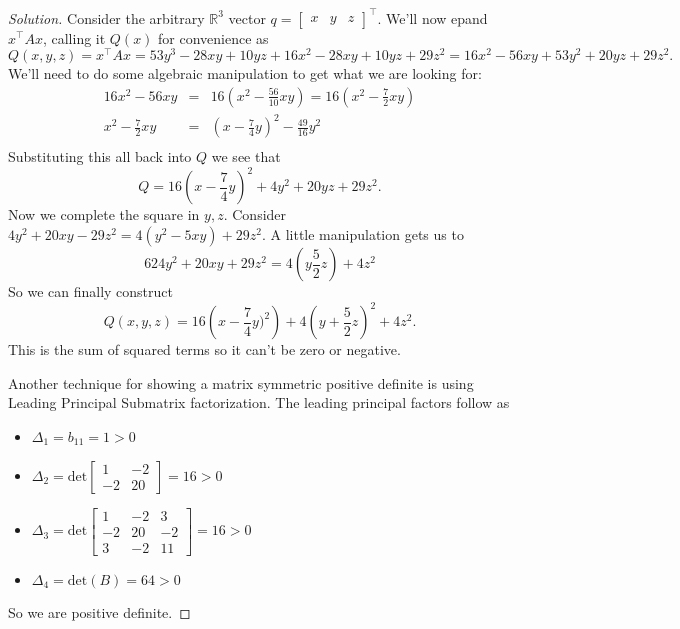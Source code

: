 \documentclass[12pt]{amsart}
\newenvironment{solution}
{\begin{proof}[Solution]}
{\end{proof}}
\begin{document}
\begin{onehalfspace}
\begin{solution}
            Consider the arbitrary $\mathbb{R}^3$ vector $q=[\begin{matrix}x & y & z\end{matrix}]^\top$.
            We'll now epand $x^\top Ax$, calling it $Q(x)$ for convenience as
            \begin{displaymath}
                Q(x,y,z) = x^\top Ax = 53y^3-28xy+10yz+16x^2-28xy+10yz+29z^2 = 16 x^2 - 56 x y + 53 y^2 + 20 y z + 29 z^2.
            \end{displaymath}
            We'll need to do some algebraic manipulation to get what we are looking for:
            \begin{eqnarray*}
                16x^2-56xy & = & 16\left(x^2 - \frac{56}{10}xy\right) = 16(x^2-\frac{7}{2}xy) \\
                x^2 - \frac{7}{2}xy & = & \left(x-\frac{7}{4}y\right)^2 - \frac{49}{16}y^2\\
            \end{eqnarray*}
            Substituting this all back into $Q$ we see that
            \begin{displaymath}
                Q = 16\left(x -\frac{7}{4}y\right)^2 +4y^2+20yz+29z^2.
            \end{displaymath}
            Now we complete the square in $y,z$.
            Consider $4y^2+20xy-29z^2=4(y^2-5xy) + 29z^2$.
            A little manipulation gets us to
            \begin{displaymath}62
                4y^2+20xy+29z^2 = 4\left(y\frac{5}{2}z\right) + 4z^2
            \end{displaymath}
            So we can finally construct
            \begin{displaymath}
                Q(x,y,z) = 16\left(x-\frac{7}{4}y)^2\right) + 4\left(y + \frac{5}{2}z\right)^2 + 4z^2.
            \end{displaymath}
            This is the sum of squared terms so it can't be zero or negative.

            Another technique for showing a matrix symmetric positive definite is using
            Leading Principal Submatrix factorization.
            The leading principal factors follow as
            \begin{itemize}
                \item[-] $\Delta_1 = b_{11} = 1 >0$
                \item[-] $\Delta_2 = \text{det}\left[\begin{matrix}1 & -2\\-2 & 20\end{matrix}\right] = 16 >0$
                \item[-] $\Delta_3 = \text{det}\left[\begin{matrix}1 & -2 & 3\\-2 & 20 & -2\\3 & -2 & 11\end{matrix}\right] = 16 > 0$
                \item[-] $\Delta_4 = \text{det}(B) = 64 >0$
            \end{itemize}
            So we are positive definite.


\end{solution}
\end{onehalfspace}
\end{document}
